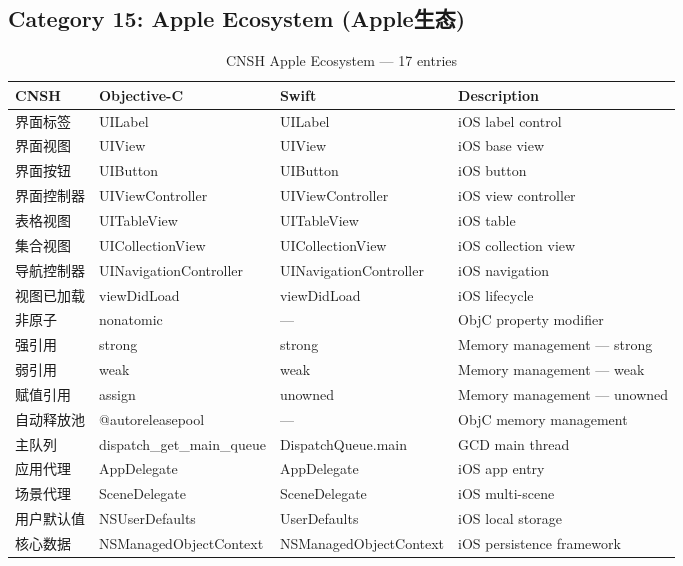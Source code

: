 \subsection{Category 15: Apple Ecosystem (Apple生态)}
\label{app:ren-apple}

\begin{table}[h]
\centering
\caption{CNSH Apple Ecosystem — 17 entries}
\renewcommand{\arraystretch}{1.2}
\fontsize{8}{10}\selectfont
\begin{tabular}{llll}
\toprule
\textbf{CNSH} & \textbf{Objective-C} & \textbf{Swift} & \textbf{Description} \\
\midrule
界面标签 & UILabel & UILabel & iOS label control \\
界面视图 & UIView & UIView & iOS base view \\
界面按钮 & UIButton & UIButton & iOS button \\
界面控制器 & UIViewController & UIViewController & iOS view controller \\
表格视图 & UITableView & UITableView & iOS table \\
集合视图 & UICollectionView & UICollectionView & iOS collection view \\
导航控制器 & UINavigationController & UINavigationController & iOS navigation \\
视图已加载 & viewDidLoad & viewDidLoad & iOS lifecycle \\
非原子 & nonatomic & — & ObjC property modifier \\
强引用 & strong & strong & Memory management — strong \\
弱引用 & weak & weak & Memory management — weak \\
赋值引用 & assign & unowned & Memory management — unowned \\
自动释放池 & @autoreleasepool & — & ObjC memory management \\
主队列 & dispatch\_get\_main\_queue & DispatchQueue.main & GCD main thread \\
应用代理 & AppDelegate & AppDelegate & iOS app entry \\
场景代理 & SceneDelegate & SceneDelegate & iOS multi-scene \\
用户默认值 & NSUserDefaults & UserDefaults & iOS local storage \\
核心数据 & NSManagedObjectContext & NSManagedObjectContext & iOS persistence framework \\
\bottomrule
\end{tabular}
\end{table}

